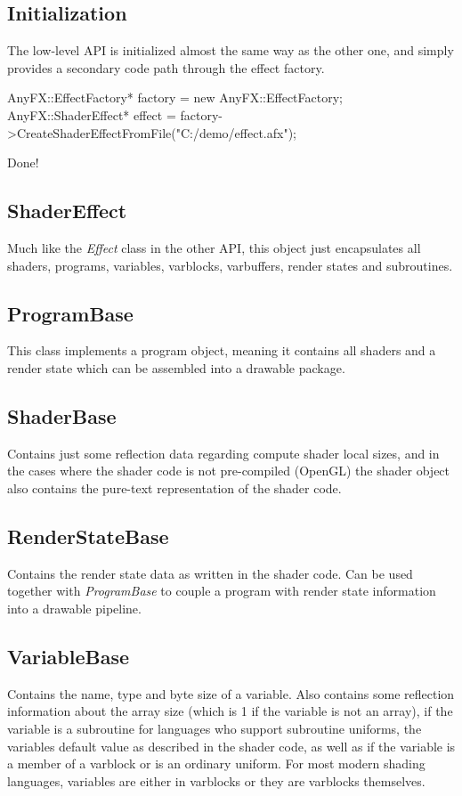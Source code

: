 \documentclass{article}
\begin{document}
\subsection{Initialization}
The low-level API is initialized almost the same way as the other one, and simply provides a secondary code path through the effect factory.

\begin{CodeBox}
	AnyFX::EffectFactory* factory = new AnyFX::EffectFactory;
	AnyFX::ShaderEffect* effect = factory->CreateShaderEffectFromFile("C:/demo/effect.afx");
\end{CodeBox}

Done!

\subsection{ShaderEffect}
Much like the \textit{Effect} class in the other API, this object just encapsulates all shaders, programs, variables, varblocks, varbuffers, render states and subroutines. 

\subsection{ProgramBase}
This class implements a program object, meaning it contains all shaders and a render state which can be assembled into a drawable package.

\subsection{ShaderBase}
Contains just some reflection data regarding compute shader local sizes, and in the cases where the shader code is not pre-compiled (OpenGL) the shader object also contains the pure-text representation of the shader code.

\subsection{RenderStateBase}
Contains the render state data as written in the shader code. Can be used together with \textit{ProgramBase} to couple a program with render state information into a drawable pipeline.

\subsection{VariableBase}
Contains the name, type and byte size of a variable. Also contains some reflection information about the array size (which is 1 if the variable is not an array), if the variable is a subroutine for languages who support subroutine uniforms, the variables default value as described in the shader code, as well as if the variable is a member of a varblock or is an ordinary uniform. For most modern shading languages, variables are either in varblocks or they are varblocks themselves.
\end{document}
